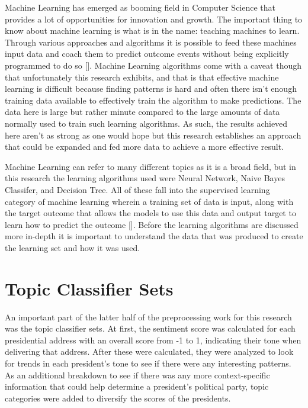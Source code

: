 Machine Learning has emerged as booming field in Computer Science that provides a lot of opportunities for innovation and growth.
The important thing to know about machine learning is what is in the name: teaching machines to learn.
Through various approaches and algorithms it is possible to feed these machines input data and coach them to predict outcome events without being explicitly programmed to do so [\cite{hansen1990neural}].
Machine Learning algorithms come with a caveat though that unfortunately this research exhibits, and that is that effective machine learning is difficult because finding patterns is hard and often there isn't enough training data available to effectively train the algorithm to make predictions.
The data here is large but rather minute compared to the large amounts of data normally used to train such learning algorithms.
As such, the results achieved here aren't as strong as one would hope but this research establishes an approach that could be expanded and fed more data to achieve a more effective result.

Machine Learning can refer to many different topics as it is a broad field, but in this research the learning algorithms used were Neural Network, Naive Bayes Classifer, and Decision Tree.
All of these fall into the supervised learning category of machine learning wherein a training set of data is input, along with the target outcome that allows the models to use this data and output target to learn how to predict the outcome [\cite{dietterich1998approximate}].
Before the learning algorithms are discussed more in-depth it is important to understand the data that was produced to create the learning set and how it was used.

\section{Topic Classifier Sets}
An important part of the latter half of the preprocessing work for this research was the topic classifier sets.
At first, the sentiment score was calculated for each presidential address with an overall score from -1 to 1, indicating their tone when delivering that address.
After these were calculated, they were analyzed to look for trends in each president's tone to see if there were any interesting patterns.
As an additional breakdown to see if there was any more context-specific information that could help determine a president's political party, topic categories were added to diversify the scores of the presidents.

